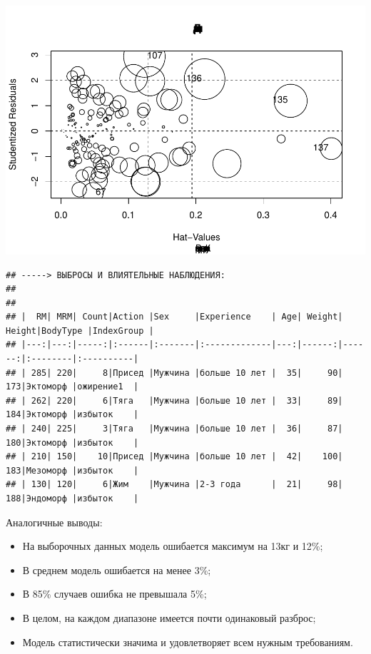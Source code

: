 \documentclass[
]{article}
\begin{document}
\begin{center}\includegraphics{Regression-model-for-estimating-RM_files/figure-latex/unnamed-chunk-34-6} \end{center}

\begin{verbatim}
## -----> ВЫБРОСЫ И ВЛИЯТЕЛЬНЫЕ НАБЛЮДЕНИЯ:
## 
## 
## |  RM| MRM| Count|Action |Sex     |Experience    | Age| Weight| Height|BodyType |IndexGroup |
## |---:|---:|-----:|:------|:-------|:-------------|---:|------:|------:|:--------|:----------|
## | 285| 220|     8|Присед |Мужчина |больше 10 лет |  35|     90|    173|Эктоморф |ожирение1  |
## | 262| 220|     6|Тяга   |Мужчина |больше 10 лет |  33|     89|    184|Эктоморф |избыток    |
## | 240| 225|     3|Тяга   |Мужчина |больше 10 лет |  36|     87|    180|Эктоморф |избыток    |
## | 210| 150|    10|Присед |Мужчина |больше 10 лет |  42|    100|    183|Мезоморф |избыток    |
## | 130| 120|     6|Жим    |Мужчина |2-3 года      |  21|     98|    188|Эндоморф |избыток    |
\end{verbatim}

Аналогичные выводы:

\begin{itemize}
\item
  На выборочных данных модель ошибается максимум на 13кг и 12\%;
\item
  В среднем модель ошибается на менее 3\%;
\item
  В 85\% случаев ошибка не превышала 5\%;
\item
  В целом, на каждом диапазоне имеется почти одинаковый разброс;
\item
  Модель статистически значима и удовлетворяет всем нужным требованиям.
\end{itemize}
\end{document}
